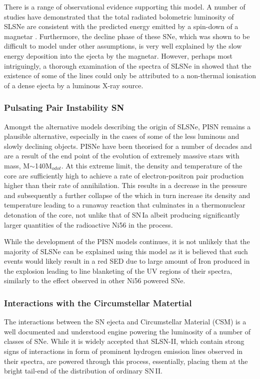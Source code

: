 There is a range of observational evidence supporting this model. A number of studies have demonstrated that the total radiated bolometric luminosity of SLSNe are consistent with the predicted energy emitted by a spin-down of a magnetar \citep{Inserra2013}. Furthermore, the decline phase of these SNe, which was shown to be difficult to model under other assumptions, is very well explained by the slow energy deposition into the ejecta by the magnetar. However, perhaps most intriguingly, a thorough examination of the spectra of SLSNe in \citet{Mazzali2015} showed that the existence of some of the lines could only be attributed to a non-thermal ionisation of a dense ejecta by a luminous X-ray source.

\subsubsection{Pulsating Pair Instability SN}
Amongst the alternative models describing the origin of SLSNe, PISN remains a plausible alternative, especially in the cases of some of the less luminous and slowly declining objects. PISNe have been theorised for a number of decades \citep{Fraley1968} and are a result of the end point of the evolution of extremely massive stars with mass, M$\sim$140M$_{odot}$. At this extreme limit, the density and temperature of the core are sufficiently high to achieve a rate of electron-positron pair production higher than their rate of annihilation. This results in a decrease in the pressure and subsequently a further collapse of the which in turn increase its density and temperature leading to a runaway reaction that culminates in a thermonuclear detonation of the core, not unlike that of SN\,Ia albeit producing significantly larger quantities of the radioactive Ni56 in the process.

While the development of the PISN models continues, it is not unlikely that the majority of SLSNe can be explained using this model as it is believed \citep{Jerkstrand2016} that such events would likely result in a red SED due to large amount of Iron produced in the explosion leading to line blanketing of the UV regions of their spectra, similarly to the effect observed in other Ni56 powered SNe.

\subsubsection{Interactions with the Circumstellar Matertial}
The interactions between the SN ejecta and Circumstellar Material (CSM) is a well documented and understood engine powering the luminosity of a number of classes of SNe. While it is widely accepted that SLSN-II, which contain strong signs of interactions in form of prominent hydrogen emission lines observed in their spectra, are powered through this process, essentially, placing them at the bright tail-end of the distribution of ordinary SN\,II.

